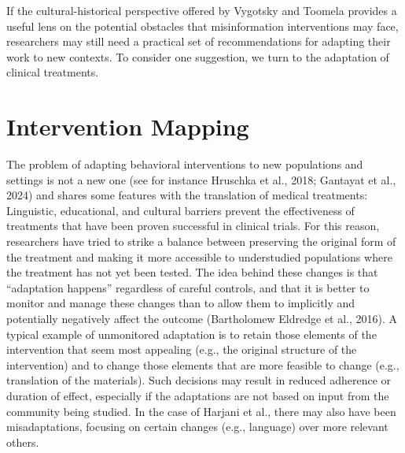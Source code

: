 \documentclass[authordate, reflection, issue]{jote-new-article}
\begin{document}
	If the cultural-historical perspective offered by Vygotsky and Toomela provides a useful lens on the potential obstacles that misinformation interventions may face, researchers may still need a practical set of recommendations for adapting their work to new contexts. To consider one suggestion, we turn to the adaptation of clinical treatments.



	\section{Intervention Mapping}



	The problem of adapting behavioral interventions to new populations and settings is not a new one (see for instance Hruschka et al., 2018; Gantayat et al., 2024) and shares some features with the translation of medical treatments: Linguistic, educational, and cultural barriers prevent the effectiveness of treatments that have been proven successful in clinical trials. For this reason, researchers have tried to strike a balance between preserving the original form of the treatment and making it more accessible to understudied populations where the treatment has not yet been tested. The idea behind these changes is that “adaptation happens” regardless of careful controls, and that it is better to monitor and manage these changes than to allow them to implicitly and potentially negatively affect the outcome (Bartholomew Eldredge et al., 2016). A typical example of unmonitored adaptation is to retain those elements of the intervention that seem most appealing (e.g., the original structure of the intervention) and to change those elements that are more feasible to change (e.g., translation of the materials). Such decisions may result in reduced adherence or duration of effect, especially if the adaptations are not based on input from the community being studied. In the case of Harjani et al., there may also have been misadaptations, focusing on certain changes (e.g., language) over more relevant others.
\end{document}
